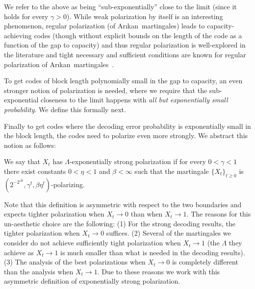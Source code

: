 \documentclass[11pt]{article}
\newcommand{\Arikan}{Ar\i kan}
\begin{document}
We refer to the above as being ``sub-exponentially'' close to the limit (since it holds for every $\gamma > 0$). While weak polarization by itself is an interesting phenomenon, regular polarization (of \Arikan\ martingales) leads to capacity-achieving codes (though without explicit bounds on the length of the code as a function of the gap to capacity) and thus regular polarization is well-explored in the literature and tight necessary and sufficient conditions are known for regular polarization of \Arikan\ martingales~\cite{arikan-telatar,KSU10}.


To get codes of block length polynomially small in the gap to capacity, an even stronger notion of polarization is needed, where we require that the sub-exponential closeness to the limit happens with \emph{all but exponentially small probability}. We define this formally next.


Finally to get codes where the decoding error probability is exponentially small in the block length, the codes need to polarize even more strongly. We abstract this notion as follows:

\begin{definition}
	\label{def:exp-strong-polarization}
	We say that $X_t$ has $\Lambda$-exponentially strong polarization if for every $0 < \gamma < 1$ there exist constants $0< \eta < 1$ and $\beta < \infty$ such that the martingale $\{X_t\}_{t \geq 0}$ is $(2^{-2^{\Lambda t}}, \gamma^t, \beta \eta^t)$-polarizing. 
\end{definition}


Note that this definition is asymmetric with respect to the two boundaries and expects tighter polarization when $X_t \to 0$ than when $X_t \to 1$. The reasons for this un-aesthetic choice are the following: (1) For the strong decoding results, the tighter polarization when $X_t \to 0$ suffices. (2) Several of the martingales we consider do not achieve sufficiently tight polarization when $X_t \to 1$ (the $\Lambda$ they achieve as $X_t \to 1$ is much smaller than what is needed in the decoding results). (3) The analysis of the best polarizations when $X_t \to 0$ is completely different than the analysis when  $X_t \to 1$. Due to these reasons we work with this asymmetric definition of exponentially strong polarization.
\end{document}
